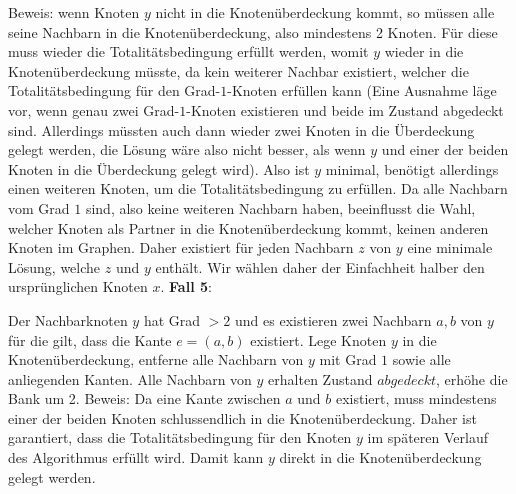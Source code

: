 \documentclass[12pt,onecolumn, notitlepage]{scrartcl}
\begin{document}
Beweis: wenn Knoten $y$ nicht in die Knotenüberdeckung kommt, so müssen alle seine Nachbarn in die Knotenüberdeckung, also mindestens 2 Knoten. Für diese muss wieder die Totalitätsbedingung erfüllt werden, womit $y$ wieder in die Knotenüberdeckung müsste, da kein weiterer Nachbar existiert, welcher die Totalitätsbedingung für den Grad-$1$-Knoten erfüllen kann (Eine Ausnahme läge vor, wenn genau zwei Grad-$1$-Knoten existieren und beide im Zustand abgedeckt sind. Allerdings müssten auch dann wieder zwei Knoten in die Überdeckung gelegt werden, die Lösung wäre also nicht besser, als wenn $y$ und einer der beiden Knoten in die Überdeckung gelegt wird). Also ist $y$ minimal, benötigt allerdings einen weiteren Knoten, um die Totalitätsbedingung zu erfüllen. Da alle Nachbarn vom Grad $1$ sind, also keine weiteren Nachbarn haben, beeinflusst die Wahl, welcher Knoten als Partner in die Knotenüberdeckung kommt, keinen anderen Knoten im Graphen. Daher existiert für jeden Nachbarn $z$ von $y$ eine minimale Lösung, welche $z$ und $y$ enthält. Wir wählen daher der Einfachheit halber den ursprünglichen Knoten $x$.\newline \newpage
\textbf{Fall 5}:\newline
\begin{center}
\end{center}
Der Nachbarknoten $y$ hat Grad $> 2$ und es existieren zwei Nachbarn $a,b$ von $y$ für die gilt, dass die Kante $e = (a,b)$ existiert. Lege Knoten $y$ in die Knotenüberdeckung, entferne alle Nachbarn von $y$ mit Grad $1$ sowie alle anliegenden Kanten. Alle Nachbarn von $y$ erhalten Zustand $abgedeckt$, erhöhe die Bank um 2.\newline
Beweis: Da eine Kante zwischen $a$ und $b$ existiert, muss mindestens einer der beiden Knoten schlussendlich in die Knotenüberdeckung. Daher ist garantiert, dass die Totalitätsbedingung für den Knoten $y$ im späteren Verlauf des Algorithmus erfüllt wird. Damit kann $y$ direkt in die Knotenüberdeckung gelegt werden.\newline \newline
\end{document}
